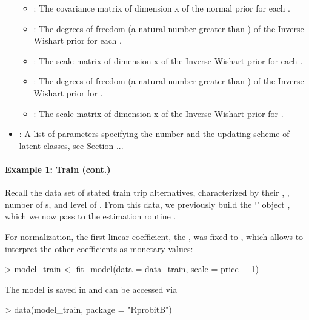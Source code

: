 \documentclass[article]{jss}
\newcommand{\class}[1]{`\code{#1}'}
\newcommand{\fct}[1]{\code{#1()}}
\begin{document}
\begin{itemize}
\begin{itemize}
    \item {}: The covariance matrix of dimension  x  of the normal prior for each .
    \item {}: The degrees of freedom (a natural number greater than ) of the Inverse Wishart prior for each .
    \item {}: The scale matrix of dimension  x  of the Inverse Wishart prior for each .
    \item {}: The degrees of freedom (a natural number greater than ) of the Inverse Wishart prior for .
    \item {}: The scale matrix of dimension  x  of the Inverse Wishart prior for .
  \end{itemize}
  \item {}: A list of parameters specifying the number and the updating scheme of latent classes, see Section ...
\end{itemize}

\paragraph{Example 1: Train (cont.)}

Recall the  data set of stated train trip alternatives, characterized by their , , number of s, and level of . From this data, we previously build the \class{RprobitB\_data} object , which we now pass to the estimation routine \fct{fit\_model}.

For normalization, the first linear coefficient, the , was fixed to , which allows to interpret the other coefficients as monetary values:

\begin{Schunk}
\begin{Sinput}
> model_train <- fit_model(data = data_train, scale = price ~ -1)
\end{Sinput}
\end{Schunk}

The model is saved in  and can be accessed via

\begin{Schunk}
\begin{Sinput}
> data(model_train, package = "RprobitB")
\end{Sinput}
\end{Schunk}
\end{document}
